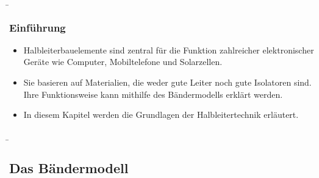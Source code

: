 \begin{frame}
    \b{
        \frametitle{Einführung}
        \begin{itemize}
            \item Halbleiterbauelemente sind zentral für die Funktion zahlreicher elektronischer Geräte wie Computer, Mobiltelefone und Solarzellen.
            \item Sie basieren auf Materialien, die weder gute Leiter noch gute Isolatoren sind. Ihre Funktionsweise kann mithilfe des Bändermodells erklärt werden.
            \item In diesem Kapitel werden die Grundlagen der Halbleitertechnik erläutert.
        \end{itemize}}
\end{frame}

\b{
    \subsection{Das Bändermodell}
}

